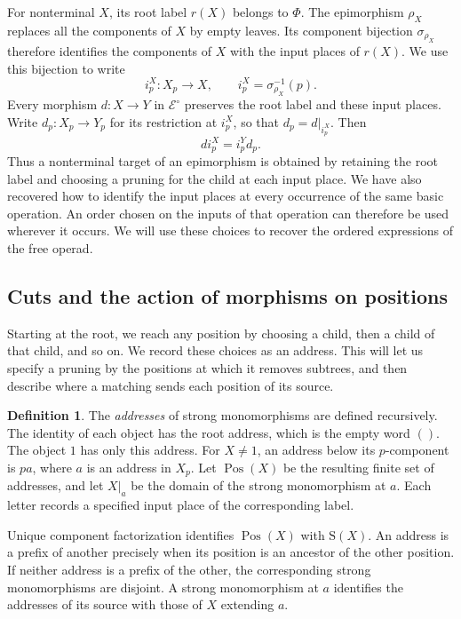 \documentclass[11pt,a4paper]{article}
\theoremstyle{plain}
\theoremstyle{definition}
\newtheorem{definition}[theorem]{Definition}
\theoremstyle{remark}
\newcommand{\Icat}{\mathcal E^\circ}
\newcommand{\one}{1}
\newcommand{\Occ}{\mathrm{S}}
\newcommand{\Pos}{\operatorname{Pos}}
\newcommand{\emptyword}{()}
\begin{document}
For nonterminal $X$, its root label $r(X)$ belongs to $\Phi$.
The epimorphism $\rho_X$ replaces all the components of $X$
by empty leaves. Its component bijection $\sigma_{\rho_X}$
therefore identifies the components of $X$ with the input places
of $r(X)$. We use this bijection to write
\begin{equation}\label{eq:ports}
i_p^X:X_p\longrightarrow X,\qquad
i_p^X=\sigma_{\rho_X}^{-1}(p).
\end{equation}
Every morphism $d:X\to Y$ in $\Icat$ preserves the root label
and these input places. Write $d_p:X_p\to Y_p$ for its
restriction at $i_p^X$, so that $d_p=d|_{i_p^X}$. Then
\begin{equation}\label{eq:local}
d i_p^X=i_p^Yd_p.
\end{equation}
Thus a nonterminal target of an epimorphism is obtained by
retaining the root label and choosing a pruning for the child
at each input place. We have also recovered how to identify
the input places at every occurrence of the same basic
operation. An order chosen on the inputs of that operation
can therefore be used wherever it occurs. We will use these
choices to recover the ordered expressions of the free operad.

\subsection{Cuts and the action of morphisms on positions}\label{sec:cuts}
Starting at the root, we reach any position by choosing a child,
then a child of that child, and so on. We record these choices
as an address. This will let us specify a pruning by the
positions at which it removes subtrees, and then describe
where a matching sends each position of its source.
\begin{definition}\label{def:addresses}
The \emph{addresses} of strong monomorphisms are defined recursively.
The identity of each object has the root address, which is the
empty word $\emptyword$. The object $\one$ has only this address.
For $X\ne\one$, an address below its $p$-component is $pa$, where
$a$ is an address in $X_p$. Let $\Pos(X)$ be the resulting finite
set of addresses, and let $X|_a$ be the domain of the strong
monomorphism at $a$.
Each letter records a specified input place of the corresponding
label.
\end{definition}

Unique component factorization identifies $\Pos(X)$ with $\Occ(X)$.
An address is a prefix of another precisely when its position is an
ancestor of the other position. If neither address is a prefix of
the other, the corresponding strong monomorphisms are disjoint.
A strong monomorphism at $a$ identifies the addresses of its source with those
of $X$ extending $a$.
\end{document}
